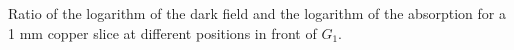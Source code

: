 Ratio of the logarithm of the dark field and the logarithm of the absorption for a 1 mm copper slice at different positions in front of $G_1$.
